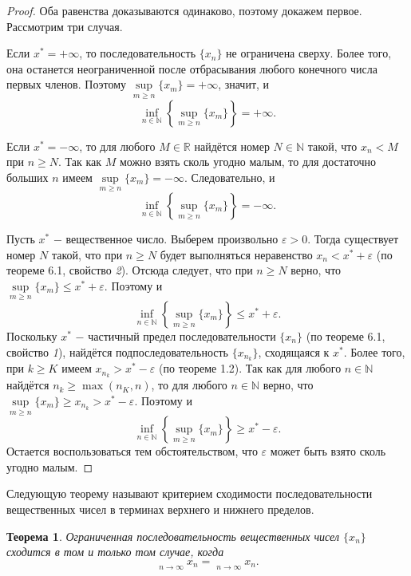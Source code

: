 \documentclass{article}
\newtheorem{theorem}{Теорема}[section]
\DeclareMathOperator*\lowlim{\underline{lim}}
\DeclareMathOperator*\uplim{\overline{lim}}
\begin{document}
\begin{proof}
Оба равенства доказываются одинаково, поэтому докажем первое. Рассмотрим три случая.

Если \(x^{*} = + \infty\), то последовательность \(\{x_n\}\) не ограничена сверху. Более того, она останется неограниченной после отбрасывания любого конечного числа первых членов. Поэтому \(\sup\limits_{m \geq n}\{x_m\} = + \infty\), значит, и
\[
\inf_{n \in \mathbb{N}}\left\lbrace{\sup_{m \geq n}\{x_m\}}\right\rbrace = + \infty.
\]

Если \(x^{*} = - \infty\), то для любого \(M \in \mathbb{R}\) найдётся номер \(N \in \mathbb{N}\) такой, что \(x_n < M\) при \(n \geq N\). Так как \(M\) можно взять сколь угодно малым, то для достаточно больших \(n\) имеем \(\sup\limits_{m \geq n}\{x_m\} = - \infty\). Следовательно, и
\[
\inf_{n \in \mathbb{N}}\left\lbrace{\sup_{m \geq n}\{x_m\}}\right\rbrace = - \infty.
\]

Пусть \(x^{*}\) \(-\) вещественное число. Выберем произвольно \(\varepsilon > 0\). Тогда существует номер \(N\) такой, что при \(n \geq N\) будет выполняться неравенство \(x_n < x^{*} + \varepsilon\) (по теореме 6.1, свойство \textit{2}). Отсюда следует, что при \(n \geq N\) верно, что \(\sup\limits_{m \geq n}\{x_m\} \leq x^{*} + \varepsilon\). Поэтому и
\[
\inf_{n \in \mathbb{N}}\left\lbrace{\sup_{m \geq n}\{x_m\}}\right\rbrace \leq x^{*} + \varepsilon.
\]
Поскольку \(x^{*}\) \(-\) частичный предел последовательности \(\{x_n\}\) (по теореме 6.1, свойство \textit{1}), найдётся подпоследовательность \(\{x_{n_k}\}\), сходящаяся к \(x^{*}\). Более того, при \(k \geq K\) имеем \(x_{n_k} > x^{*} - \varepsilon\) (по теореме 1.2). Так как для любого \(n \in \mathbb{N}\) найдётся \(n_k \geq \max(n_K, n)\), то для любого \(n \in \mathbb{N}\) верно, что \(\sup\limits_{m \geq n}\{x_m\} \geq x_{n_k} > x^{*} - \varepsilon\). Поэтому и
\[
\inf_{n \in \mathbb{N}}\left\lbrace{\sup_{m \geq n}\{x_m\}}\right\rbrace \geq x^{*} - \varepsilon.
\]
Остается воспользоваться тем обстоятельством, что \(\varepsilon\) может быть взято сколь угодно малым.
\end{proof}

Следующую теорему называют критерием сходимости последовательности вещественных чисел в терминах верхнего и нижнего пределов.

\begin{theorem}
Ограниченная последовательность вещественных чисел \(\{x_n\}\) сходится в том и только том случае, когда
\[
\lowlim\limits_{n \to \infty}{x_n} = \uplim\limits_{n \to \infty}{x_n}.
\]
\end{theorem}
\end{document}
